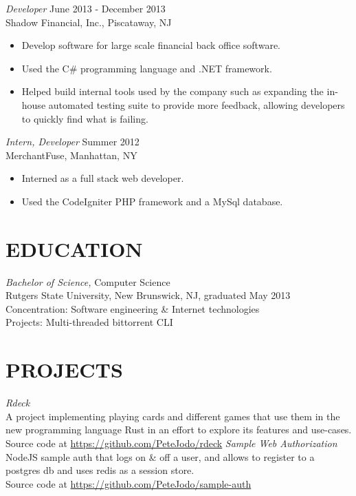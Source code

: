 \documentclass[margin]{res}
\begin{document}
\begin{resume}
                {\sl Developer} \hfill June 2013 - December 2013 \\
                Shadow Financial, Inc., Piscataway, NJ
                 \begin{itemize}  \itemsep -2pt %
                 \item Develop software for large scale financial back office software.
                 \item Used the C\# programming language and .NET framework.
                 \item Helped build internal tools used by the company such as expanding the in-house automated testing suite to provide more feedback, allowing developers to quickly find what is failing.
                 \end{itemize}
                 
               {\sl Intern, Developer} \hfill            Summer 2012 \\
                MerchantFuse, Manhattan, NY
                 \begin{itemize}  \itemsep -2pt %
                 \item Interned as a full stack web developer.
                 \item Used the CodeIgniter PHP framework and a MySql database.
                 \end{itemize} 
 
\section{EDUCATION} {\sl Bachelor of Science,} Computer Science \\
                Rutgers State University, New Brunswick, NJ, 
                graduated May 2013 \\
                Concentration: Software engineering \& Internet technologies \\
                Projects: Multi-threaded bittorrent CLI \\
 
\section{PROJECTS}  {\sl Rdeck} \\
					A project implementing playing cards and different games that use them in the new programming language Rust in an effort to explore its features and use-cases.   \\
					Source code at \url{https://github.com/PeteJodo/rdeck} \newline \newline
					{\sl Sample Web Authorization} \\
					NodeJS sample auth that logs on \& off a user, and allows to register to a postgres db and uses redis as a session store. \\
					Source code at \url{https://github.com/PeteJodo/sample-auth}
                 
 

\end{resume}
\end{document}
